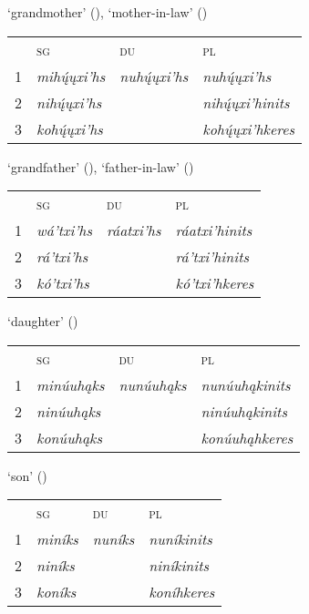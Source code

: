 \begin{exe}
\begin{xlist}
\item\label{ListOfKinshipTerms8} `grandmother' (\Hermaphrodite), `mother-in-law' (\Female)

    \begin{tabular}{llll}
    ~ &\textsc{sg}&\textsc{du}&\textsc{pl}\\
    1&  \textit{mihų́ųxi'hs}&   \textit{nuhų́ųxi'hs}                                         &\textit{nuhų́ųxi'hs}\\
    2&  \textit{nihų́ųxi'hs}&    &\textit{nihų́ųxi'hinits}\\
    3&  \textit{kohų́ųxi'hs}&    &\textit{kohų́ųxi'hkeres}
    \end{tabular}

\newpage
    
\item\label{ListOfKinshipTerms9} `grandfather' (\Hermaphrodite), `father-in-law' (\Female)

    \begin{tabular}{llll}
    ~ &\textsc{sg}&\textsc{du}&\textsc{pl}\\
    1&  \textit{wá'txi'hs}&   \textit{ráatxi'hs}                                         &\textit{ráatxi'hinits}\\
    2&  \textit{rá'txi'hs}&    &\textit{rá'txi'hinits}\\
    3&  \textit{kó'txi'hs}&    &\textit{kó'txi'hkeres}
    \end{tabular}

    
\item\label{ListOfKinshipTerms10} `daughter' (\Hermaphrodite)

    \begin{tabular}{llll}
    ~ &\textsc{sg}&\textsc{du}&\textsc{pl}\\
    1&  \textit{minúuhąks}&   \textit{nunúuhąks}                                         &\textit{nunúuhąkinits}\\
    2&  \textit{ninúuhąks}&    &\textit{ninúuhąkinits}\\
    3&  \textit{konúuhąks}&    &\textit{konúuhąhkeres}
    \end{tabular}

\item\label{ListOfKinshipTerms11} `son' (\Hermaphrodite)

    \begin{tabular}{llll}
    ~ &\textsc{sg}&\textsc{du}&\textsc{pl}\\
    1&  \textit{miníks}&   \textit{nuníks}                                         &\textit{nuníkinits}\\
    2&  \textit{niníks}&    &\textit{niníkinits}\\
    3&  \textit{koníks}&    &\textit{koníhkeres}
    \end{tabular}



\end{xlist}
\end{exe}
